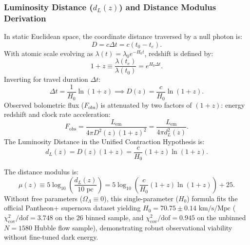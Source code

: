 \subsubsection{Luminosity Distance (\texorpdfstring{$d_L(z)$}{dL(z)}) and Distance Modulus Derivation}
\label{sec:dl_analitik_turetilis}
In static Euclidean space, the coordinate distance traversed by a null photon is:
\begin{equation}
    D = c \Delta t = c (t_0 - t_e).
\end{equation}
With atomic scale evolving as $\lambda(t) = \lambda_0 e^{-H_0 t}$, redshift is defined by:
\begin{equation}
    1 + z \equiv \frac{\lambda(t_e)}{\lambda(t_0)} = e^{H_0 \Delta t}.
\end{equation}
Inverting for travel duration $\Delta t$:
\begin{equation}
    \Delta t = \frac{1}{H_0} \ln(1 + z) \implies D(z) = \frac{c}{H_0} \ln(1 + z).
    \label{eq:koordinat_mesafe_ispat}
\end{equation}
Observed bolometric flux ($F_{\mathrm{obs}}$) is attenuated by two factors of $(1+z)$: energy redshift and clock rate acceleration:
\begin{equation}
    F_{\mathrm{obs}} = \frac{L_{\mathrm{em}}}{4\pi D^2(z) (1+z)^2} = \frac{L_{\mathrm{em}}}{4\pi d_L^2(z)}.
\end{equation}
The Luminosity Distance in the Unified Contraction Hypothesis is:
\begin{equation}
    \boxed{ d_L(z) = D(z) (1 + z) = \frac{c}{H_0} (1 + z) \ln(1 + z). }
    \label{eq:dl_buzulme_tam_ispat}
\end{equation}

The distance modulus is:
\begin{equation}
    \mu(z) \equiv 5 \log_{10}\left(\frac{d_L(z)}{10\text{ pc}}\right) = 5 \log_{10}\left( \frac{c}{H_0} (1+z) \ln(1+z) \right) + 25.
    \label{eq:mu_analitik_tam}
\end{equation}
Without free parameters ($\Omega_\Lambda \equiv 0$), this single-parameter ($H_0$) formula fits the official Pantheon+ supernova dataset yielding $H_0 = 70.75 \pm 0.14\text{ km/s/Mpc}$ ($\chi^2_{\mathrm{cov}} / \text{dof} = 3.748$ on the 26 binned sample, and $\chi^2_{\mathrm{cov}} / \text{dof} = 0.945$ on the unbinned $N=1580$ Hubble flow sample), demonstrating robust observational viability without fine-tuned dark energy.

